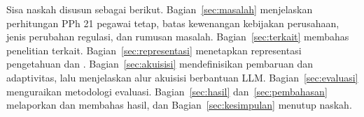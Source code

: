 Sisa naskah disusun sebagai berikut. Bagian~\ref{sec:masalah} menjelaskan perhitungan PPh 21 pegawai tetap, batas kewenangan kebijakan perusahaan, jenis perubahan regulasi, dan rumusan masalah. Bagian~\ref{sec:terkait} membahas penelitian terkait. Bagian~\ref{sec:representasi} menetapkan representasi pengetahuan dan . Bagian~\ref{sec:akuisisi} mendefinisikan pembaruan dan adaptivitas, lalu menjelaskan alur akuisisi berbantuan LLM. Bagian~\ref{sec:evaluasi} menguraikan metodologi evaluasi. Bagian~\ref{sec:hasil} dan~\ref{sec:pembahasan} melaporkan dan membahas hasil, dan Bagian~\ref{sec:kesimpulan} menutup naskah.

